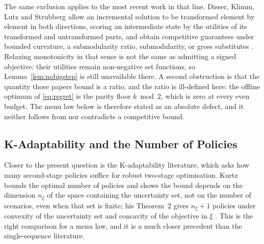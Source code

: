 The same exclusion applies to the most recent work in that line. Disser, Klimm, Lutz and
Strubberg allow an incremental solution to be transformed element by element in both
directions, scoring an intermediate state by the utilities of its transformed and
untransformed parts, and obtain competitive guarantees under bounded curvature, a
submodularity ratio, submodularity, or gross substitutes \cite{disser2025}. Relaxing
monotonicity in that sense is not the same as admitting a signed objective: their utilities
remain non-negative set functions, so Lemma~\ref{lem:nobigstep} is still unavailable there.
A second obstruction is that the quantity those papers bound is a ratio, and the ratio is
ill-defined here: the offline optimum of \eqref{eq:regret} is the parity floor
$k\bmod 2$, which is zero at every even budget. The menu law below is therefore stated as an
absolute defect, and it neither follows from nor contradicts a competitive bound.

\subsection{K-Adaptability and the Number of Policies}

Closer to the present question is the K-adaptability literature, which asks how many
second-stage policies suffice for robust two-stage optimisation. Kurtz bounds the optimal
number of policies and shows the bound depends on the dimension $n_{\xi}$ of the space
containing the uncertainty set, not on the number of scenarios, even when that set is finite;
his Theorem~2 gives $n_{\xi}+1$ policies under convexity of the uncertainty set and concavity
of the objective in $\xi$ \cite{kurtz2026}. This is the right comparison for a menu law, and
it is a much closer precedent than the single-sequence literature.

